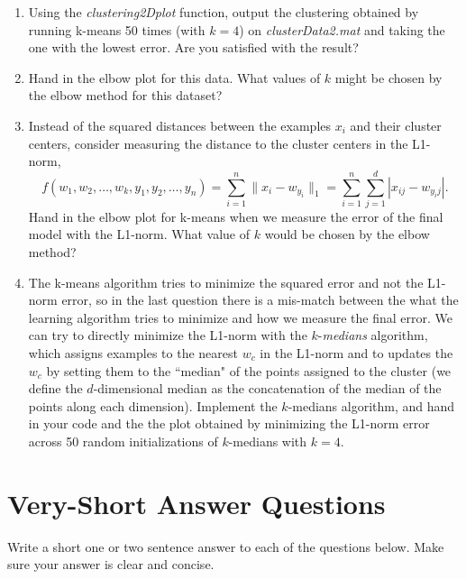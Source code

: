 \documentclass{article}
\def\blu#1{{\color{blu}#1}}
\def\norm#1{\|#1\|}
\def\enum#1{\begin{enumerate}#1\end{enumerate}}
\begin{document}
 \blu{\enum{
 \item Using the \emph{clustering2Dplot} function, output the clustering obtained by running k-means 50 times (with $k=4$) on \emph{clusterData2.mat} and taking the one with the lowest error. Are you satisfied with the result?
 \item Hand in the elbow plot for this data. What values of $k$ might be chosen by the elbow method for this dataset?
 \item Instead of the squared distances between the examples $x_i$ and their cluster centers, consider measuring the distance to the cluster centers in the L1-norm,
\[
f(w_1,w_2,\dots,w_k,y_1,y_2,\dots,y_n) = \sum_{i=1}^n \norm{x_i - w_{y_i}}_1 = \sum_{i=1}^n \sum_{j=1}^d |x_{ij} - w_{y_ij}|.
\]
Hand in the elbow plot for k-means when we measure the error of the final model with the L1-norm.
What value of $k$ would be chosen by the elbow method?
 \item The k-means algorithm tries to minimize the squared error and not the L1-norm error, so in the last question there is a mis-match between the what the learning algorithm tries to minimize and how we measure the final error. We can try to directly minimize the L1-norm with the $k$-\emph{medians} algorithm, which assigns examples to the nearest $w_c$ in the L1-norm and to updates the $w_c$ by setting them to the ``median" of the points assigned to the cluster (we define the $d$-dimensional median as the concatenation of the median of the points along each dimension). Implement the $k$-medians algorithm, and hand in your code and the the plot obtained by minimizing the L1-norm error across 50 random initializations of $k$-medians with $k=4$.
}
}

\pagebreak

\section{Very-Short Answer Questions}

\blu{Write a short one or two sentence answer to each of the questions below}. Make sure your answer is clear and concise.
\end{document}
